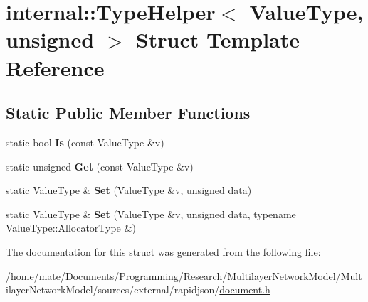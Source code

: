 \hypertarget{structinternal_1_1TypeHelper_3_01ValueType_00_01unsigned_01_4}{}\section{internal\+:\+:Type\+Helper$<$ Value\+Type, unsigned $>$ Struct Template Reference}
\label{structinternal_1_1TypeHelper_3_01ValueType_00_01unsigned_01_4}
\subsection*{Static Public Member Functions}
\begin{DoxyCompactItemize}
\item 
static bool {\bfseries Is} (const Value\+Type \&v)\hypertarget{structinternal_1_1TypeHelper_3_01ValueType_00_01unsigned_01_4_ad1c1cb931ed166508d17e866d410c99b}{}\label{structinternal_1_1TypeHelper_3_01ValueType_00_01unsigned_01_4_ad1c1cb931ed166508d17e866d410c99b}

\item 
static unsigned {\bfseries Get} (const Value\+Type \&v)\hypertarget{structinternal_1_1TypeHelper_3_01ValueType_00_01unsigned_01_4_a2f91befe1e9e914e7431b84c0d89f572}{}\label{structinternal_1_1TypeHelper_3_01ValueType_00_01unsigned_01_4_a2f91befe1e9e914e7431b84c0d89f572}

\item 
static Value\+Type \& {\bfseries Set} (Value\+Type \&v, unsigned data)\hypertarget{structinternal_1_1TypeHelper_3_01ValueType_00_01unsigned_01_4_a1d960542fd618ac649fe4e045c44f789}{}\label{structinternal_1_1TypeHelper_3_01ValueType_00_01unsigned_01_4_a1d960542fd618ac649fe4e045c44f789}

\item 
static Value\+Type \& {\bfseries Set} (Value\+Type \&v, unsigned data, typename Value\+Type\+::\+Allocator\+Type \&)\hypertarget{structinternal_1_1TypeHelper_3_01ValueType_00_01unsigned_01_4_a601b05a233b6025486a9105d45d46780}{}\label{structinternal_1_1TypeHelper_3_01ValueType_00_01unsigned_01_4_a601b05a233b6025486a9105d45d46780}

\end{DoxyCompactItemize}


The documentation for this struct was generated from the following file\+:\begin{DoxyCompactItemize}
\item 
/home/mate/\+Documents/\+Programming/\+Research/\+Multilayer\+Network\+Model/\+Multilayer\+Network\+Model/sources/external/rapidjson/\hyperlink{document_8h}{document.\+h}\end{DoxyCompactItemize}
